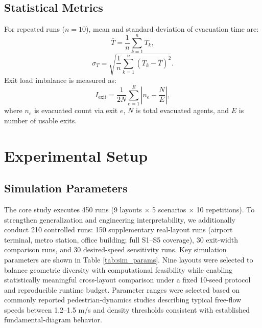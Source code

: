 \documentclass[utf8]{FrontiersinHarvard}
\begin{document}
\subsection{Statistical Metrics}
For repeated runs ($n=10$), mean and standard deviation of evacuation time are:
\begin{equation}
    \bar{T}=\frac{1}{n}\sum_{k=1}^{n}T_k,
\end{equation}
\begin{equation}
    \sigma_T=\sqrt{\frac{1}{n}\sum_{k=1}^{n}(T_k-\bar{T})^2}.
\end{equation}
Exit load imbalance is measured as:
\begin{equation}
    I_{\mathrm{exit}}=\frac{1}{2N}\sum_{e=1}^{E}\left|n_e-\frac{N}{E}\right|,
\end{equation}
where $n_e$ is evacuated count via exit $e$, $N$ is total evacuated agents, and $E$ is number of usable exits.

\section{Experimental Setup}
\subsection{Simulation Parameters}
The core study executes 450 runs (9 layouts $\times$ 5 scenarios $\times$ 10 repetitions). To strengthen generalization and engineering interpretability, we additionally conduct 210 controlled runs: 150 supplementary real-layout runs (airport terminal, metro station, office building; full S1--S5 coverage), 30 exit-width comparison runs, and 30 desired-speed sensitivity runs. Key simulation parameters are shown in Table \ref{tab:sim_params}.
Nine layouts were selected to balance geometric diversity with computational feasibility while enabling statistically meaningful cross-layout comparison under a fixed 10-seed protocol and reproducible runtime budget.
Parameter ranges were selected based on commonly reported pedestrian-dynamics studies describing typical free-flow speeds between 1.2--1.5 m/s and density thresholds consistent with established fundamental-diagram behavior.
\end{document}
